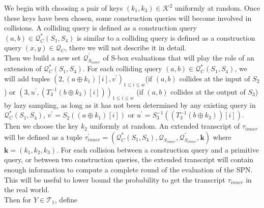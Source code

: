 We begin with choosing a pair of keys $\left(k_{1}, k_{3}\right) \in \mathcal{K}^{2}$ uniformly at random. Once these keys have been chosen, some construction queries will become involved in collisions. A colliding query is defined as a construction query $(a, b) \in \mathcal{Q}_{C}^{*}\left(S_{1}, S_{4}\right)$ is similar to a colliding query is defined as a construction query $(x, y) \in \mathcal{Q}_{C}$, there we will not describe it in detail.\\

Then we build a new set $\mathcal{Q}_{S_{inner}}^{\prime}$ of S-box evaluations that will play the role of an extension of $\mathcal{Q}_{C}^{*}\left(S_{1}, S_{4}\right)$. For each colliding query $(a, b) \in \mathcal{Q}_{C}^{*}\left(S_{1}, S_{4}\right)$, we will add tuples $\left(2, \left(a \oplus k_{1}\right)[i], v^{\prime}\right)_{1 \leq i \leq w}$(if $(a, b)$ collides at the input of $S_2$) or $\left(3, u^{\prime}, \left(T_{3}^{-1}\left(b \oplus k_{3}\right)[i]\right)\right)_{1 \leq i \leq w}$ (if $(a, b)$ collides at the output of $S_3$) by lazy sampling, as long as it has not been determined by any existing query in $\mathcal{Q}_{C}^{*}\left(S_{1}, S_{4}\right)$, $v^{\prime}=S_{2}(\left(a \oplus k_{1}\right)[i])$ or $u^{\prime}=S_{3}^{-1}(\left(T_{3}^{-1}\left(b \oplus k_{3}\right) \right)[i])$. Then we choose the key $k_2$ uniformly at random. An extended transcript of $\tau_{inner}$ will be defined as a tuple $\tau_{inner}^{\prime}=\left(\mathcal{Q}_{C}^{*}\left(S_{1}, S_{4}\right), \mathcal{Q}_{S_{inner}}, \mathcal{Q}_{S_{inner}}^{\prime}, \mathbf{k}\right)$ where $\mathbf{k}=\left(k_{1}, k_{2}, k_{3}\right)$. For each collision between a construction query and a primitive query, or between two construction queries, the extended transcript will contain enough information to compute a complete round of the evaluation of the SPN. This will be useful to lower bound the probability to get the transcript $\tau_{inner}$ in the real world.\\

Then for $Y \in \mathcal{T}_{1}$, define

